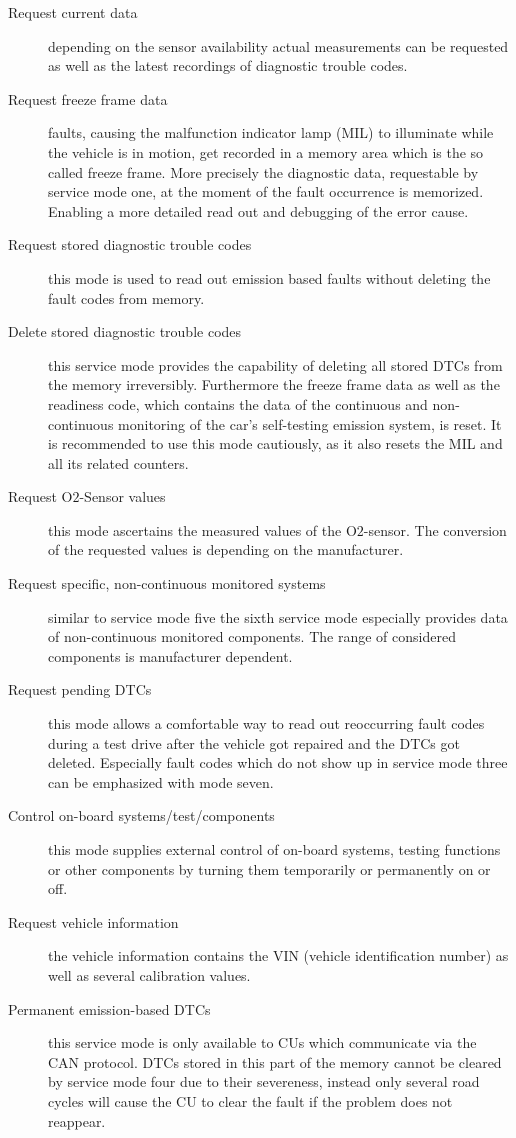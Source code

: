 \begin{description}
 \item[Request current data] depending on the sensor availability actual measurements can be requested as well as the latest recordings of diagnostic trouble codes.
 \item[Request freeze frame data] faults, causing the malfunction indicator lamp (MIL) to illuminate while the vehicle is in motion, get recorded in a memory area which is the so called freeze frame. More precisely the diagnostic data, requestable by service mode one, at the moment of the fault occurrence is memorized. Enabling a more detailed read out and debugging of the error cause.
 \item[Request stored diagnostic trouble codes] this mode is used to read out emission based faults without deleting the fault codes from memory.
 \item[Delete stored diagnostic trouble codes] this service mode provides the capability of deleting all stored DTCs from the memory irreversibly. Furthermore the freeze frame data as well as the readiness code, which contains the data of the continuous and non-continuous monitoring of the car’s self-testing emission system, is reset. It is recommended to use this mode cautiously, as it also resets the MIL and all its related counters.
 \item[Request O$2$-Sensor values] this mode ascertains the measured values of the O$2$-sensor. The conversion of the requested values is depending on the manufacturer.
 \item[Request specific, non-continuous monitored systems] similar to service mode five the sixth service mode especially provides data of non-continuous monitored components. The range of considered components is  manufacturer dependent.
 \item[Request pending DTCs] this mode allows a comfortable way to read out reoccurring fault codes during a test drive after the vehicle got repaired and the DTCs got deleted. Especially fault codes which do not show up in service mode three can be emphasized with mode seven.
 \item[Control on-board systems/test/components]  this mode supplies external control of on-board systems, testing functions or other components by turning them temporarily or permanently  on or off.
 \item[Request vehicle information] the vehicle information contains the VIN (vehicle identification number) as well as several calibration values.
 \item[Permanent emission-based DTCs] this service mode is only available to CUs which communicate via the CAN protocol. DTCs stored in this part of the memory cannot be cleared by service mode four due to their severeness, instead only several road cycles will cause the CU to clear the fault if the problem does not reappear.
\end{description}

